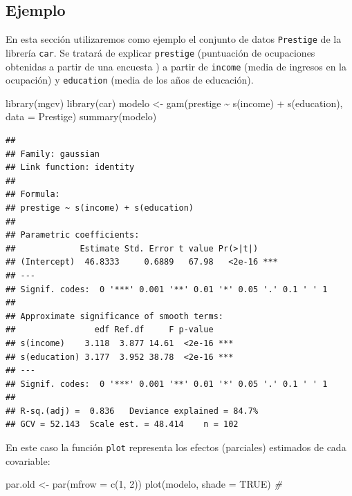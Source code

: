 \documentclass[
]{book}
\newenvironment{Shaded}{\begin{snugshade}}{\end{snugshade}}
\newcommand{\AttributeTok}[1]{\textcolor[rgb]{0.77,0.63,0.00}{#1}}
\newcommand{\CommentTok}[1]{\textcolor[rgb]{0.56,0.35,0.01}{\textit{#1}}}
\newcommand{\ConstantTok}[1]{\textcolor[rgb]{0.00,0.00,0.00}{#1}}
\newcommand{\DecValTok}[1]{\textcolor[rgb]{0.00,0.00,0.81}{#1}}
\newcommand{\FunctionTok}[1]{\textcolor[rgb]{0.00,0.00,0.00}{#1}}
\newcommand{\NormalTok}[1]{#1}
\newcommand{\OtherTok}[1]{\textcolor[rgb]{0.56,0.35,0.01}{#1}}
\newcommand{\SpecialCharTok}[1]{\textcolor[rgb]{0.00,0.00,0.00}{#1}}
\theoremstyle{break}
\theoremstyle{nonumberplain}
\begin{document}
\hypertarget{ejemplo-3}{%
\subsection{Ejemplo}\label{ejemplo-3}}

En esta sección utilizaremos como ejemplo el conjunto de datos \texttt{Prestige} de la librería \texttt{car}.
Se tratará de explicar \texttt{prestige} (puntuación de ocupaciones obtenidas a partir de una encuesta )
a partir de \texttt{income} (media de ingresos en la ocupación) y \texttt{education} (media de los años de
educación).

\begin{Shaded}
\begin{Highlighting}[]
\FunctionTok{library}\NormalTok{(mgcv)}
\FunctionTok{library}\NormalTok{(car)}
\NormalTok{modelo }\OtherTok{\textless{}{-}} \FunctionTok{gam}\NormalTok{(prestige }\SpecialCharTok{\textasciitilde{}} \FunctionTok{s}\NormalTok{(income) }\SpecialCharTok{+} \FunctionTok{s}\NormalTok{(education), }\AttributeTok{data =}\NormalTok{ Prestige)}
\FunctionTok{summary}\NormalTok{(modelo)}
\end{Highlighting}
\end{Shaded}

\begin{verbatim}
## 
## Family: gaussian 
## Link function: identity 
## 
## Formula:
## prestige ~ s(income) + s(education)
## 
## Parametric coefficients:
##             Estimate Std. Error t value Pr(>|t|)    
## (Intercept)  46.8333     0.6889   67.98   <2e-16 ***
## ---
## Signif. codes:  0 '***' 0.001 '**' 0.01 '*' 0.05 '.' 0.1 ' ' 1
## 
## Approximate significance of smooth terms:
##                edf Ref.df     F p-value    
## s(income)    3.118  3.877 14.61  <2e-16 ***
## s(education) 3.177  3.952 38.78  <2e-16 ***
## ---
## Signif. codes:  0 '***' 0.001 '**' 0.01 '*' 0.05 '.' 0.1 ' ' 1
## 
## R-sq.(adj) =  0.836   Deviance explained = 84.7%
## GCV = 52.143  Scale est. = 48.414    n = 102
\end{verbatim}

En este caso la función \texttt{plot} representa los efectos (parciales) estimados de cada covariable:

\begin{Shaded}
\begin{Highlighting}[]
\NormalTok{par.old }\OtherTok{\textless{}{-}} \FunctionTok{par}\NormalTok{(}\AttributeTok{mfrow =} \FunctionTok{c}\NormalTok{(}\DecValTok{1}\NormalTok{, }\DecValTok{2}\NormalTok{))}
\FunctionTok{plot}\NormalTok{(modelo, }\AttributeTok{shade =} \ConstantTok{TRUE}\NormalTok{) }\CommentTok{\# }
\end{Highlighting}
\end{Shaded}
\end{document}
